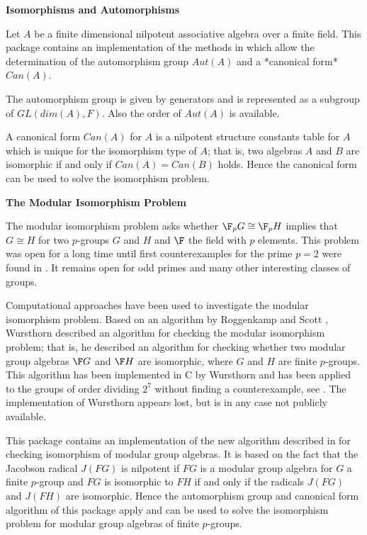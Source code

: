 {\bf Isomorphisms and Automorphisms}

Let $A$ be a finite dimensional nilpotent associative algebra over a 
finite field. This package contains an implementation of the methods 
in \cite{Eic07} which allow the determination of the automorphism group 
$Aut(A)$ and a *canonical form* $Can(A)$. 

The automorphism group is given by generators and is represented as a
subgroup of $GL(dim(A), F)$. Also the order of $Aut(A)$ is available.

A canonical form $Can(A)$ for $A$ is a nilpotent structure constants 
table for $A$ which is unique for the isomorphism type of $A$; 
that is, two algebras $A$ and $B$ are isomorphic if and only if $Can(A) 
= Can(B)$ holds. Hence the canonical form can be used to solve the 
isomorphism problem. 
\medskip

{\bf The Modular Isomorphism Problem}

The modular isomorphism problem asks whether $\F_p G \cong \F_p H$ implies
that $G \cong H$ for two $p$-groups $G$ and $H$ and $\F$ the field with $p$
elements. This problem was open for a long time until first counterexamples
for the prime $p=2$ were found in \cite{GLMdR22}. It remains open for odd
primes and many other interesting classes of groups.

Computational approaches have been used to investigate the modular isomorphism
problem. Based on an algorithm by Roggenkamp and Scott \cite{RS93}, Wursthorn
\cite{Wur93} described an algorithm for checking the modular isomorphism
problem; that is, he described an algorithm for checking whether two modular
group algebras $\F G$ and $\F H$ are isomorphic, where $G$ and $H$ are finite
$p$-groups. This algorithm has been
implemented in C by Wursthorn and has been applied to the groups of
order dividing $2^7$ without finding a counterexample, see \cite{BKRW99}.
The implementation of Wursthorn appears lost, but is in any case not publicly
available.
\medskip

This package contains an implementation of the new algorithm described in
\cite{Eic07} for checking isomorphism of modular group algebras. It is based
on the fact that the Jacobson radical $J(FG)$ is nilpotent if $FG$ is a 
modular group algebra for $G$ a finite $p$-group and $FG$ is isomorphic to $FH$ if and only if the radicals
$J(FG)$ and $J(FH)$ are isomorphic. Hence the automorphism group and canonical form 
algorithm of this package apply and can be used to solve the isomorphism
problem for modular group algebras of finite $p$-groups.

